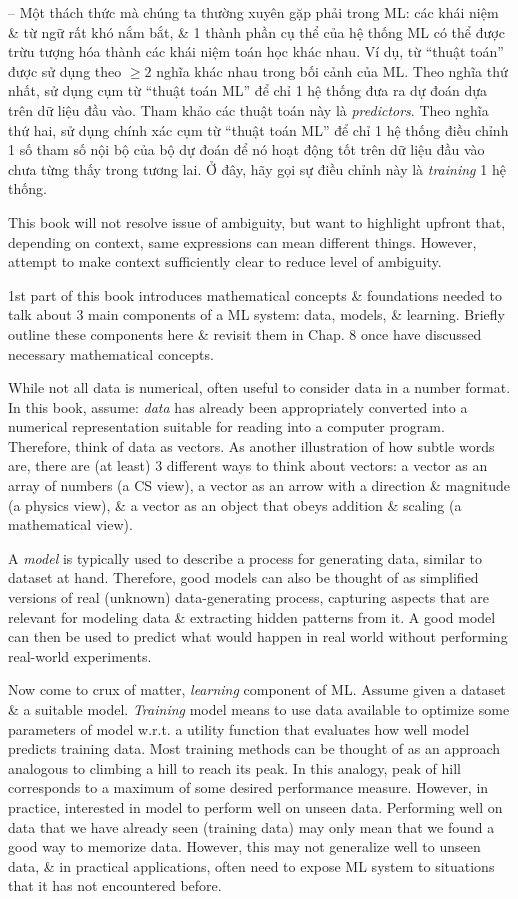\documentclass{article}
\begin{document}
\begin{itemize}
\begin{itemize}
		-- Một thách thức mà chúng ta thường xuyên gặp phải trong ML: các khái niệm \& từ ngữ rất khó nắm bắt, \& 1 thành phần cụ thể của hệ thống ML có thể được trừu tượng hóa thành các khái niệm toán học khác nhau. Ví dụ, từ ``thuật toán'' được sử dụng theo $\ge2$ nghĩa khác nhau trong bối cảnh của ML. Theo nghĩa thứ nhất, sử dụng cụm từ ``thuật toán ML'' để chỉ 1 hệ thống đưa ra dự đoán dựa trên dữ liệu đầu vào. Tham khảo các thuật toán này là {\it predictors}. Theo nghĩa thứ hai, sử dụng chính xác cụm từ ``thuật toán ML'' để chỉ 1 hệ thống điều chỉnh 1 số tham số nội bộ của bộ dự đoán để nó hoạt động tốt trên dữ liệu đầu vào chưa từng thấy trong tương lai. Ở đây, hãy gọi sự điều chỉnh này là {\it training} 1 hệ thống.
		
		This book will not resolve issue of ambiguity, but want to highlight upfront that, depending on context, same expressions can mean different things. However, attempt to make context sufficiently clear to reduce level of ambiguity.
		
		1st part of this book introduces mathematical concepts \& foundations needed to talk about 3 main components of a ML system: data, models, \& learning. Briefly outline these components here \& revisit them in Chap. 8 once have discussed necessary mathematical concepts.
		
		While not all data is numerical, often useful to consider data in a number format. In this book, assume: {\it data} has already been appropriately converted into a numerical representation suitable for reading into a computer program. Therefore, think of data as vectors. As another illustration of how subtle words are, there are (at least) 3 different ways to think about vectors: a vector as an array of numbers (a CS view), a vector as an arrow with a direction \& magnitude (a physics view), \& a vector as an object that obeys addition \& scaling (a mathematical view).
		
		A {\it model} is typically used to describe a process for generating data, similar to dataset at hand. Therefore, good models can also be thought of as simplified versions of real (unknown) data-generating process, capturing aspects that are relevant for modeling data \& extracting hidden patterns from it. A good model can then be used to predict what would happen in real world without performing real-world experiments.
		
		Now come to crux of matter, {\it learning} component of ML. Assume given a dataset \& a suitable model. {\it Training} model means to use data available to optimize some parameters of model w.r.t. a utility function that evaluates how well model predicts training data. Most training methods can be thought of as an approach analogous to climbing a hill to reach its peak. In this analogy, peak of hill corresponds to a maximum of some desired performance measure. However, in practice, interested in model to perform well on unseen data. Performing well on data that we have already seen (training data) may only mean that we found a good way to memorize data. However, this may not generalize well to unseen data, \& in practical applications, often need to expose ML system to situations that it has not encountered before.
		

\end{itemize}
\end{itemize}
\end{document}
